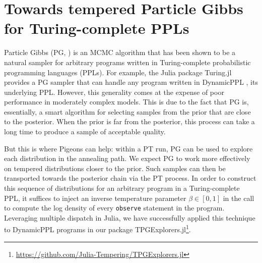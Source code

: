 \section{Towards tempered Particle Gibbs for Turing-complete PPLs}

Particle Gibbs (PG, \citealp{andrieu2010particle}) is an MCMC
algorithm that has been shown \citep{wood2014new} to be a natural sampler for
arbitrary programs written in Turing-complete probabilistic programming 
languages (PPLs). For example, the Julia package Turing.jl \citep{ge2018turing}
provides a PG sampler that can handle any program written in DynamicPPL
\citep{tarek2020dynamicppl}, its underlying PPL.
However, this generality comes at the expense of poor performance in moderately
complex models. This is due to the fact that PG is, essentially, a smart 
algorithm for selecting samples from the prior that are close to the posterior.
When the prior is far from the posterior, this process can take a long time to
produce a sample of acceptable quality.

But this is where Pigeons can help: within a PT run, PG can be
used to explore each distribution in the annealing path. We expect PG to work 
more effectively on tempered 
distributions closer to the prior. Such samples can then be transported towards 
the posterior chain via the PT process.
In order to construct this sequence of distributions for an arbitrary program in
a Turing-complete PPL, it suffices to inject an inverse temperature parameter 
$\beta\in[0,1]$ in the call to compute the log density of every \texttt{observe} 
statement in the program. Leveraging multiple dispatch in Julia, we have
successfully applied this technique to DynamicPPL programs in our package
TPGExplorers.jl\footnote{\url{https://github.com/Julia-Tempering/TPGExplorers.jl}}.
